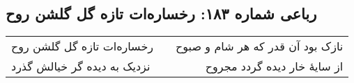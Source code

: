 \begin{center}
\section*{رباعی شماره ۱۸۳: رخساره‌ات تازه گل گلشن روح}
\label{sec:sh183}
\begin{longtable}{l p{0.5cm} r}
رخساره‌ات تازه گل گلشن روح
&&
نازک بود آن قدر که هر شام و صبوح
\\
نزدیک به دیده گر خیالش گذرد
&&
از سایهٔ خار دیده گردد مجروح
\\
\end{longtable}
\end{center}
